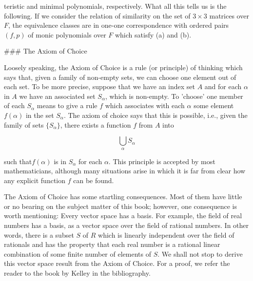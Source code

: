 teristic and minimal polynomials, respectively. What all this tells us is the following. If we consider the relation of similarity on the set of \(3\times 3\) matrices over \(F\), the equivalence classes are in one-one correspondence with ordered pairs \((f,p)\) of monic polynomials over \(F\) which satisfy (a) and (b).

### The Axiom of Choice

Loosely speaking, the Axiom of Choice is a rule (or principle) of thinking which says that, given a family of non-empty sets, we can choose one element out of each set. To be more precise, suppose that we have an index set \(A\) and for each \(\alpha\) in \(A\) we have an associated set \(S_{\alpha}\), which is non-empty. To 'choose' one member of each \(S_{\alpha}\) means to give a rule \(f\) which associates with each \(\alpha\) some element \(f(\alpha)\) in the set \(S_{\alpha}\). The axiom of choice says that this is possible, i.e., given the family of sets \(\{S_{\alpha}\}\), there exists a function \(f\) from \(A\) into

\[\bigcup_{\alpha}S_{\alpha}\]

such that\(f(\alpha)\) is in \(S_{\alpha}\) for each \(\alpha\). This principle is accepted by most mathematicians, although many situations arise in which it is far from clear how any explicit function \(f\) can be found.

The Axiom of Choice has some startling consequences. Most of them have little or no bearing on the subject matter of this book; however, one consequence is worth mentioning: Every vector space has a basis. For example, the field of real numbers has a basis, as a vector space over the field of rational numbers. In other words, there is a subset \(S\) of \(R\) which is linearly independent over the field of rationals and has the property that each real number is a rational linear combination of some finite number of elements of \(S\). We shall not stop to derive this vector space result from the Axiom of Choice. For a proof, we refer the reader to the book by Kelley in the bibliography.

 